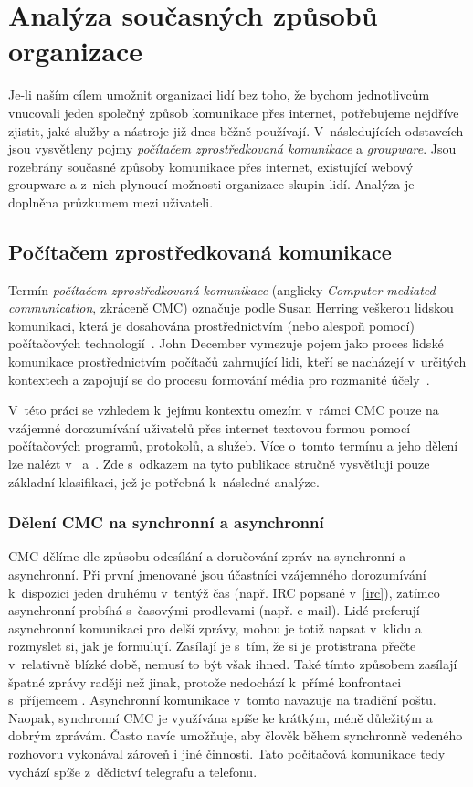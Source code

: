 \documentclass[12pt,oneside,final]{fithesis2}
\begin{document}
\chapter{Analýza současných způsobů organizace}\label{analysis}
Je-li naším cílem umožnit organizaci lidí bez toho, že bychom jednotlivcům vnucovali jeden společný způsob komunikace přes internet, potřebujeme nejdříve zjistit, jaké služby a nástroje již dnes běžně používají. V~následujících odstavcích jsou vysvětleny pojmy \emph{počítačem zprostředkovaná komunikace} a \emph{groupware}. Jsou rozebrány současné způsoby komunikace přes internet, existující webový groupware a z~nich plynoucí možnosti organizace skupin lidí. Analýza je doplněna průzkumem mezi uživateli.


\section{Počítačem zprostředkovaná komunikace}\label{cmc}
Termín \emph{počítačem zprostředkovaná komunikace} (anglicky \emph{Computer-mediated communication}, zkráceně CMC) označuje podle Susan Herring veškerou lidskou komunikaci, která je dosahována prostřednictvím (nebo alespoň pomocí) počítačových technologií~\cite{thurlow2004computer}. John December vymezuje pojem jako proces lidské komunikace prostřednictvím počítačů zahrnující lidi, kteří se nacházejí v~určitých kontextech a zapojují se do procesu formování média pro rozmanité účely~\cite{december1997notes}.

V~této práci se vzhledem k~jejímu kontextu omezím v~rámci CMC pouze na vzájemné dorozumívání uživatelů přes internet textovou formou pomocí počítačových programů, protokolů, a služeb. Více o~tomto termínu a jeho dělení lze nalézt v~\cite{thurlow2004computer} a~\cite{rulik2006computer}. Zde s~odkazem na tyto publikace stručně vysvětluji pouze základní klasifikaci, jež je potřebná k~následné analýze.

\subsection{Dělení CMC na synchronní a asynchronní}
CMC dělíme dle způsobu odesílání a doručování zpráv na synchronní a asynchronní. Při první jmenované jsou účastníci vzájemného dorozumívání k~dispozici jeden druhému v~tentýž čas (např. IRC popsané v~\ref{irc}), zatímco asynchronní probíhá s~časovými prodlevami (např. e-mail). Lidé preferují asynchronní komunikaci pro delší zprávy, mohou je totiž napsat v~klidu a rozmyslet si, jak je formulují. Zasílají je s~tím, že si je protistrana přečte v~relativně blízké době, nemusí to být však ihned. Také tímto způsobem zasílají špatné zprávy raději než jinak, protože nedochází k~přímé konfrontaci s~příjemcem \cite{joszova2009trendy}. Asynchronní komunikace v~tomto navazuje na tradiční poštu. Naopak, synchronní CMC je využívána spíše ke krátkým, méně důležitým a dobrým zprávám. Často navíc umožňuje, aby člověk během synchronně vedeného rozhovoru vykonával zároveň i jiné činnosti. Tato počítačová komunikace tedy vychází spíše z~dědictví telegrafu a telefonu.
\end{document}
